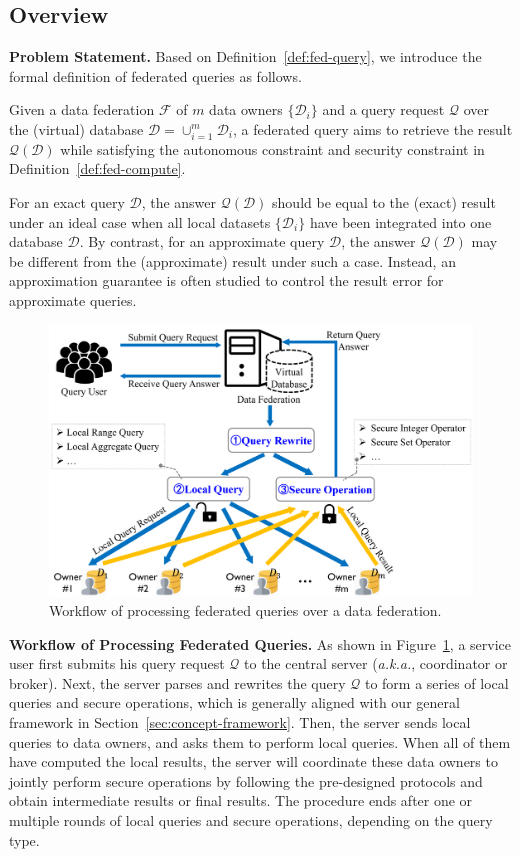 \documentclass[11pt]{article}
\newcommand{\aka}{\textit{a.k.a.},\xspace}
\newcommand\figref[1]{Figure~\ref{#1}}
\newcommand\secref[1]{Section~\ref{#1}}
\newcommand\defref[1]{Definition~\ref{#1}}
\newcommand{\fakeparagraph}[1]{\vspace{1mm}\noindent\textbf{#1.}}
\newcommand{\F}{\mathcal{F}}
\newcommand{\D}{\mathcal{D}}
\newcommand{\Q}{\mathcal{Q}}
\begin{document}
\subsection{Overview}\label{sec:data-overview}

\fakeparagraph{Problem Statement}
Based on \defref{def:fed-query}, we introduce the formal definition of federated queries as follows.

\begin{definition}\label{def:fed-query}
	Given a data federation $\F$ of $m$ data owners $\{\D_i\}$ and a query request $\Q$ over the (virtual) database $\D=\cup_{i=1}^{m}{\D_i}$,
	a federated query aims to retrieve the result $\Q(\D)$ while satisfying the autonomous constraint and security constraint in \defref{def:fed-compute}.
\end{definition}

For an exact query $\D$, the answer $\Q(\D)$ should be equal to the (exact) result under an ideal case when all local datasets $\{\D_i\}$ have been integrated into one database $\D$.
By contrast, for an approximate query $\D$, the answer $\Q(\D)$ may be different from the (approximate) result under such a case.
Instead, an approximation guarantee is often studied to control the result error for approximate queries.

\begin{figure}[t]
\centering
    \includegraphics[width=0.7\linewidth]{fig/query.png}
	\caption{Workflow of processing federated queries over a data federation.}\label{fig:workflow-query}
\end{figure}

\fakeparagraph{Workflow of Processing Federated Queries}
As shown in \figref{fig:workflow-query}, a service user first submits his query request $\Q$ to the central server (\aka coordinator or broker).
Next, the server parses and rewrites the query $\Q$ to form a series of local queries and secure operations, which is generally aligned with our general framework in \secref{sec:concept-framework}.
Then, the server sends local queries to data owners, and asks them to perform local queries.
When all of them have computed the local results, the server will coordinate these data owners to jointly perform secure operations by following the pre-designed protocols and obtain intermediate results or final results.
The procedure ends after one or multiple rounds of local queries and secure operations, depending on the query type.
\end{document}
